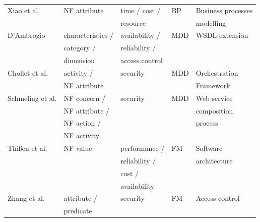 \documentclass[english,12pt]{article}
\begin{document}
\begin{table}[ht!]
\begin{tabular}{l|l|l|l|l}
  \hline 
  Xiao et al. \cite{XiaoCZBOLH08} &  NF attribute  & time / cost /   & BP  & Business processes   \\   
                                                    &                      & resource         &       &  modelling \\
  \hline 
  D'Ambrogio \cite{DAmbrogio06} &  characteristics /  & availability /                & MDD & WSDL extension \\
                                                     & category /            & reliability /                  &         &  \\
                                                     & dimension            & access control             &         &  \\
   \hline
  Chollet et al. \cite{CholletL09} & activity /             & security  & MDD  & Orchestration   \\
                                                  & NF attribute        &              &            &   Framework  \\
  \hline
  Schmeling et al. \cite{SchmelingCM11} & NF concern /      & security &  MDD &  Web service  \\
                                                               & NF attribute /    &               &          &  composition              \\
                                                               & NF action /        &               &          &   process         \\
                                                               & NF activity         &               &          &   \\ 
  \hline
    Thi{\ss}en et al. \cite{ThissenW06} & NF value  & performance /   &  FM & Software  \\  
                                                          &                & reliability /         &       &   architecture        \\
                                                          &                & cost /                 &        &            \\
                                                          &                & availability &  & \\  
  \hline
  Zhang et al. \cite{ZhangPSP05} & attribute / & security & FM &  Access control   \\
                                                   & predicate  &              &       &               \\

\end{tabular}
\end{table}
\end{document}
